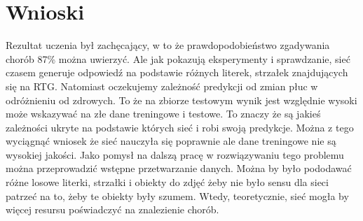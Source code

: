 \documentclass{article}
\begin{document}
\section{Wnioski}
Rezultat uczenia był zachęcający, w to że prawdopodobieństwo zgadywania chorób 87\% można uwierzyć. Ale jak pokazują eksperymenty i sprawdzanie, sieć czasem generuje odpowiedź na podstawie różnych literek, strzałek znajdujących się na RTG. Natomiast oczekujemy zależność predykcji od zmian płuc w odróżnieniu od zdrowych. To że na zbiorze testowym wynik jest względnie wysoki może wskazywać na złe dane treningowe i testowe. To znaczy że są jakieś zależności ukryte na podstawie których sieć i robi swoją predykcje. Można z tego wyciągnąć wniosek że sieć nauczyła się poprawnie ale dane treningowe nie są wysokiej jakości. Jako pomysł na dalszą pracę w rozwiązywaniu tego problemu można przeprowadzić wstępne przetwarzanie danych. Można by było pododawać różne losowe literki, strzałki i obiekty do zdjęć żeby nie było sensu dla sieci patrzeć na to, żeby te obiekty były szumem. Wtedy, teoretycznie, sieć mogła by więcej resursu poświadczyć na znalezienie chorób.


	
\end{document}
